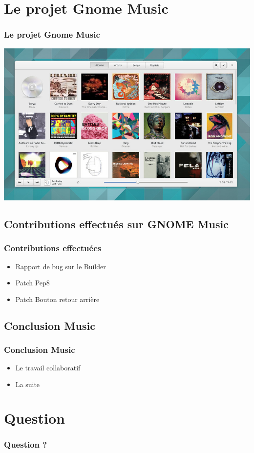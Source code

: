 \documentclass{beamer}
\begin{document}
\section{Le projet Gnome Music}
\begin{frame}
  \frametitle{Le projet Gnome Music}
  \includegraphics[scale=0.35]{images/gnome-music-app.png}
\end{frame}

\subsection{Contributions effectués sur GNOME Music}
\begin{frame}
  \frametitle{Contributions effectuées}
  \begin{itemize}
  \item Rapport de bug sur le Builder
  \item Patch Pep8
  \item Patch Bouton retour arrière
  \end{itemize}
\end{frame}

\subsection{Conclusion Music}
\begin{frame}
  \frametitle{Conclusion Music}
  \begin{itemize}
  \item Le travail collaboratif
  \item La suite
  \end{itemize}
\end{frame}

\section{Question}
\begin{frame}
  \frametitle{Question ?}
\end{frame}
\end{document}
